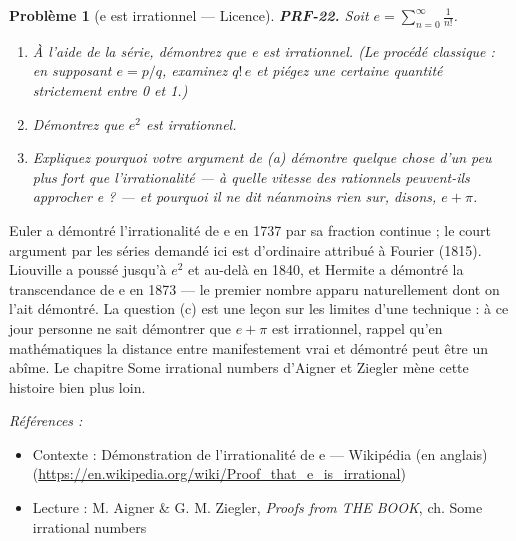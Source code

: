 \documentclass[11pt]{article}
\newtheorem{problem}{Problème}
\newenvironment{refs}{\par\small\noindent\emph{Références :}\begin{itemize}\setlength\itemsep{0pt}}{\end{itemize}\normalsize}
\begin{document}
\begin{problem}[{e est irrationnel --- Licence}]
\textbf{PRF-22.} Soit $ e = \sum_{n=0}^{\infty} \frac{1}{n!} $.
\begin{enumerate}
\item[(a)] À l'aide de la série, démontrez que e est irrationnel. (Le procédé classique : en
supposant $ e = p/q $, examinez $ q! \, e $ et piégez une certaine quantité strictement
entre 0 et 1.)
\item[(b)] Démontrez que $ e^2 $ est irrationnel.
\item[(c)] Expliquez pourquoi votre argument de (a) démontre quelque chose d'un peu plus fort que
l'irrationalité --- à quelle vitesse des rationnels peuvent-ils approcher e ? --- et pourquoi il
ne dit néanmoins rien sur, disons, $ e + \pi $.
\end{enumerate}

\end{problem}

\noindent Euler a démontré l'irrationalité de e en 1737 par sa fraction continue ; le
court argument par les séries demandé ici est d'ordinaire attribué à Fourier (1815).
Liouville a poussé jusqu'à $ e^2 $ et au-delà en 1840, et Hermite a démontré la
transcendance de e en 1873 --- le premier nombre apparu naturellement dont on l'ait démontré.
La question (c) est une leçon sur les limites d'une technique : à ce jour personne ne sait
démontrer que $ e + \pi $ est irrationnel, rappel qu'en mathématiques la distance entre
\og{} manifestement vrai \fg{} et \og{} démontré \fg{} peut être un abîme. Le chapitre \og{} Some irrational
numbers \fg{} d'Aigner et Ziegler mène cette histoire bien plus loin.

\begin{refs}
\item Contexte : Démonstration de l'irrationalité de e --- Wikipédia (en anglais) (\url{https://en.wikipedia.org/wiki/Proof_that_e_is_irrational})
\item Lecture : M. Aigner \& G. M. Ziegler, \textit{Proofs from THE BOOK}, ch. \og{} Some irrational numbers \fg{}
\end{refs}

\bigskip
\end{document}
